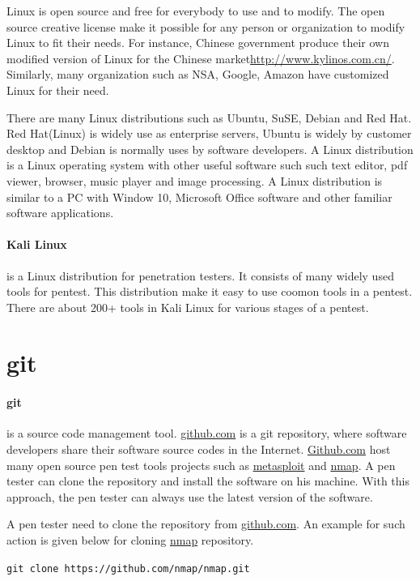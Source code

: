 \documentclass[7x9]{times}
\begin{document}
Linux is open source and free for everybody to use and to modify. The open source creative license make it possible for any person or organization to modify Linux to fit their needs. For instance, Chinese government produce their own modified version of Linux for the Chinese market\url{http://www.kylinos.com.cn/}. Similarly, many organization such as NSA, Google, Amazon have customized Linux for their need.

There are many Linux distributions such as Ubuntu, SuSE, Debian and Red Hat. Red Hat(Linux) is widely use as enterprise servers, Ubuntu is widely by customer desktop and Debian is normally uses by software developers. A Linux distribution is a Linux operating system with other useful software such such text editor, pdf viewer, browser, music player and image processing. A Linux distribution is similar to a PC with Window 10, Microsoft Office software and other familiar software applications.



\paragraph{Kali Linux}is a Linux distribution for penetration testers. It consists of many widely used tools for pentest. This distribution make it easy to use coomon tools in a pentest. There are about 200+ tools in Kali Linux for various stages of a pentest.

\section{git}

\paragraph{git}\cite{loeliger2012} is a source code management tool. \url{github.com} is a git
repository, where software developers share their software source codes in the Internet. \url{Github.com} host many open source pen test tools projects such as \url{metasploit} and \url{nmap}. A pen tester can clone the repository and install the software on his machine. With this approach, the pen tester can always use the latest version of the software.

A pen tester need to clone the repository from \url{github.com}. An example for such action is given below for cloning \url{nmap} repository.


\verb|git clone https://github.com/nmap/nmap.git|
\end{document}

